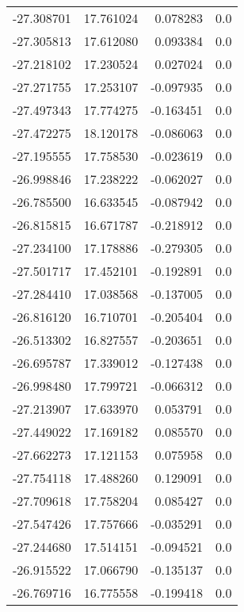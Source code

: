 \begin{tabular}{rrrr}
      -27.308701 &        17.761024 &    0.078283 &   0.0 \\
      -27.305813 &        17.612080 &    0.093384 &   0.0 \\
      -27.218102 &        17.230524 &    0.027024 &   0.0 \\
      -27.271755 &        17.253107 &   -0.097935 &   0.0 \\
      -27.497343 &        17.774275 &   -0.163451 &   0.0 \\
      -27.472275 &        18.120178 &   -0.086063 &   0.0 \\
      -27.195555 &        17.758530 &   -0.023619 &   0.0 \\
      -26.998846 &        17.238222 &   -0.062027 &   0.0 \\
      -26.785500 &        16.633545 &   -0.087942 &   0.0 \\
      -26.815815 &        16.671787 &   -0.218912 &   0.0 \\
      -27.234100 &        17.178886 &   -0.279305 &   0.0 \\
      -27.501717 &        17.452101 &   -0.192891 &   0.0 \\
      -27.284410 &        17.038568 &   -0.137005 &   0.0 \\
      -26.816120 &        16.710701 &   -0.205404 &   0.0 \\
      -26.513302 &        16.827557 &   -0.203651 &   0.0 \\
      -26.695787 &        17.339012 &   -0.127438 &   0.0 \\
      -26.998480 &        17.799721 &   -0.066312 &   0.0 \\
      -27.213907 &        17.633970 &    0.053791 &   0.0 \\
      -27.449022 &        17.169182 &    0.085570 &   0.0 \\
      -27.662273 &        17.121153 &    0.075958 &   0.0 \\
      -27.754118 &        17.488260 &    0.129091 &   0.0 \\
      -27.709618 &        17.758204 &    0.085427 &   0.0 \\
      -27.547426 &        17.757666 &   -0.035291 &   0.0 \\
      -27.244680 &        17.514151 &   -0.094521 &   0.0 \\
      -26.915522 &        17.066790 &   -0.135137 &   0.0 \\
      -26.769716 &        16.775558 &   -0.199418 &   0.0 \\

\end{tabular}
